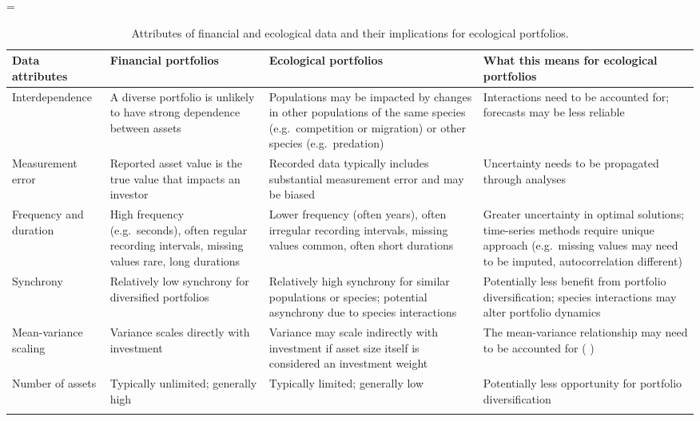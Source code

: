 \LTcapwidth=\textwidth
{}
\begin{footnotesize}

\begin{longtable}{>{\RaggedRight}p{2.7cm}>{\RaggedRight}p{3.3cm}>{\RaggedRight}p{3.9cm}>{\RaggedRight}p{4.2cm}}

\caption{Attributes of financial and ecological data and their implications for ecological portfolios.}\\
\toprule

\textbf{Data attributes} &
\textbf{Financial portfolios} &
\textbf{Ecological portfolios} &
\textbf{What this means for ecological portfolios}\\

\midrule

Interdependence &
A diverse portfolio is unlikely to have strong dependence between assets &
Populations may be impacted by changes in other populations of the same species (e.g.\ competition or migration) or other species (e.g.\ predation) &
Interactions need to be accounted for; forecasts may be less reliable\\

Measurement error &
Reported asset value is the true value that impacts an investor &
Recorded data typically includes substantial measurement error and may be biased &
Uncertainty needs to be propagated through analyses\\

Frequency and duration &
High frequency (e.g.\ seconds), often regular recording intervals, missing values rare, long durations &
Lower frequency (often years), often irregular recording intervals, missing values common, often short durations &
Greater uncertainty in optimal solutions; time-series methods require unique approach (e.g.\ missing values may need to be imputed, autocorrelation different)\\

Synchrony &
Relatively low synchrony for diversified portfolios &
Relatively high synchrony for similar populations or species; potential asynchrony due to species interactions &
Potentially less benefit from portfolio diversification; species interactions may alter portfolio dynamics\\

Mean-variance scaling &
Variance scales directly with investment &
Variance may scale indirectly with investment if asset size itself is considered an investment weight &
The mean-variance relationship may need to be accounted for (\citeauthor{anderson2013} \citeyear{anderson2013})\\

Number of assets &
Typically unlimited; generally high &
Typically limited; generally low &
Potentially less opportunity for portfolio diversification\\

\bottomrule
\label{tab:data}
\end{longtable}
\end{footnotesize}
